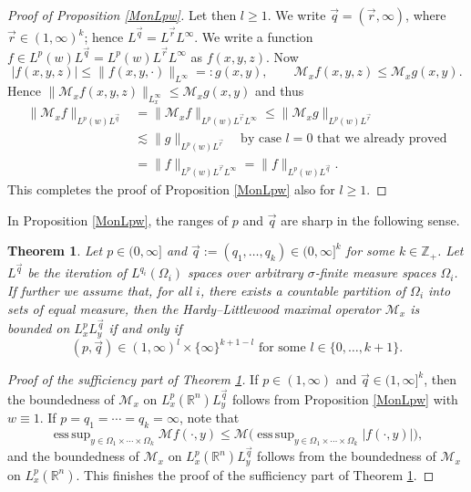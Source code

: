 \documentclass[11pt, reqno]{amsart}
\newtheorem{theorem}{Theorem}[section]
\theoremstyle{definition}
\theoremstyle{remark}
\numberwithin{equation}{section}
\newcommand{\vq}{\vec q}
\newcommand{\vr}{\vec r}
\newcommand{\abs}[1]{|#1|}
\newcommand{\Norm}[2]{\|#1\|_{#2}}
\begin{document}
\begin{proof}[Proof of Proposition \ref{MonLpw}]
Let then $l\geq 1$. We write $\vq=(\vec r,\infty)$, where $\vr\in(1,\infty)^k$; hence $L^{\vq}=L^{\vr}L^\infty$. We write a function $f\in L^p(w)L^{\vq}=L^p(w)L^{\vr}L^\infty$ as $f(x,y,z)$. Now
\begin{equation*}
  \abs{f(x,y,z)}\leq\Norm{f(x,y,\cdot)}{L^\infty}=:g(x,y),\qquad
  \mathcal M_x f(x,y,z)\leq \mathcal M_x g(x,y).
\end{equation*}
Hence $\Norm{\mathcal M_x f(x,y,z)}{L^\infty_x}\leq \mathcal M_x g(x,y)$ and thus
\begin{equation*}
\begin{split}
  \Norm{\mathcal M_x f}{L^p(w)L^{\vq}}
  &=\Norm{\mathcal M_x f}{L^p(w)L^{\vr}L^\infty}
  \leq\Norm{\mathcal M_x g}{L^p(w)L^{\vr}} \\
  &\lesssim\Norm{g}{L^p(w)L^{\vr}}\quad\text{by case $l=0$ that we already proved} \\
  &=\Norm{f}{L^p(w)L^{\vr}L^\infty}
  =\Norm{f}{L^p(w)L^{\vq}}.
\end{split}
\end{equation*}
This completes the proof of Proposition \ref{MonLpw} also for $l\geq 1$.
\end{proof}

In Proposition \ref{MonLpw}, the ranges of $p$ and $\vec q$ are sharp in the following sense.

\begin{theorem}\label{MonLp}
Let $p\in(0,\infty]$ and $\vec q:=(q_1,\ldots,q_k)
\in(0,\infty]^k$ for some $k\in\mathbb Z_+$.
Let $L^{\vq}$ be
the iteration of $L^{q_i}(\Omega_i)$ spaces
over arbitrary $\sigma$-finite measure spaces $\Omega_i$.
If further we assume that,
for all $i$, there exists a countable partition of $\Omega_i$
into sets of equal measure,
then the Hardy--Little\-wood maximal operator $\mathcal M_x$
is bounded on $L^p_xL^{\vq}_y$ if and only if
\begin{equation}\label{range}
(p,\vec q)\in(1,\infty)^l\times\{\infty\}^{k+1-l}
\text{ for some }l\in\{0,\ldots,k+1\}.
\end{equation}
\end{theorem}

\begin{proof}[Proof of the sufficiency part of Theorem \ref{MonLp}]
If $p\in(1,\infty)$ and $\vec q\in(1,\infty]^k$,
then the boundedness of $\mathcal M_x$ on $L^p_x(\mathbb R^n)L^{\vq}_y$
follows from Proposition \ref{MonLpw} with $w\equiv1$.
If $p=q_1=\cdots=q_k=\infty$, note that
$$
\mathop{\operatorname{ess\,sup}}
_{y\in\Omega_1\times\cdots\times\Omega_k} \mathcal Mf(\cdot,y)
\leq \mathcal M\Bigg(\mathop{\operatorname{ess\,sup}}
_{y\in\Omega_1\times\cdots\times\Omega_k} |f(\cdot,y)|\Bigg),
$$
and the boundedness of $\mathcal M_x$ on $L^p_x(\mathbb R^n)L^{\vq}_y$ follows from the boundedness of $\mathcal M_x$ on $L^p_x(\mathbb R^n)$.
This finishes the proof of the sufficiency part of Theorem \ref{MonLp}.
\end{proof}
\end{document}
